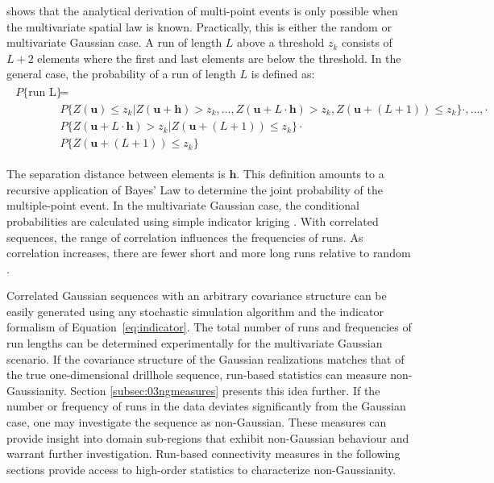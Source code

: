 \cite{ortiz2003characterization} shows that the analytical derivation of multi-point events is only possible when the multivariate spatial law is known. Practically, this is either the random or multivariate Gaussian case. A run of length $L$ above a threshold $z_{k}$ consists of $L+2$ elements where the first and last elements are below the threshold. In the general case, the probability of a run of length $L$ is defined as:
\begin{align}
    \begin{split}
        P\{\text{run L}\} & =                                                                                                                                                                \\
                          & P\{Z(\mathbf{u}) \leq z_{k}| Z(\mathbf{u + h}) > z_{k},\dots, Z(\mathbf{u} + L \cdot \mathbf{h}) > z_{k}, Z(\mathbf{u} + (L+1)) \leq z_{k}\} \cdot ,\dots, \cdot \\
                          & P\{Z(\mathbf{u} + L \cdot \mathbf{h}) > z_{k} | Z(\mathbf{u} + (L+1)) \leq z_{k}\} \cdot                                                                         \\
                          & P\{Z(\mathbf{u} + (L+1)) \leq z_{k}\}
    \end{split}
\end{align}

The separation distance between elements is $\mathbf{h}$. This definition amounts to a recursive application of Bayes' Law to determine the joint probability of the multiple-point event. In the multivariate Gaussian case, the conditional probabilities are calculated using simple indicator kriging \citep{journel1989nongaussian}. With correlated sequences, the range of correlation influences the frequencies of runs. As correlation increases, there are fewer short and more long runs relative to random \citep{ortiz2003characterization}.

Correlated Gaussian sequences with an arbitrary covariance structure can be easily generated using any stochastic simulation algorithm and the indicator formalism of Equation~\ref{eq:indicator}. The total number of runs and frequencies of run lengths can be determined experimentally for the multivariate Gaussian scenario. If the covariance structure of the Gaussian realizations matches that of the true one-dimensional drillhole sequence, run-based statistics can measure non-Gaussianity. Section \ref{subsec:03ngmeasures} presents this idea further. If the number or frequency of runs in the data deviates significantly from the Gaussian case, one may investigate the sequence as non-Gaussian. These measures can provide insight into domain sub-regions that exhibit non-Gaussian behaviour and warrant further investigation. Run-based connectivity measures in the following sections provide access to high-order statistics to characterize non-Gaussianity.

